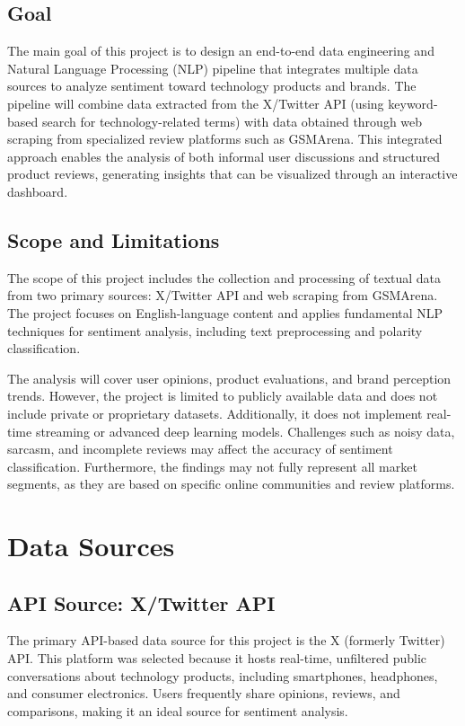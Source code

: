 \documentclass[12pt]{article}
\begin{document}
\subsection{Goal}
The main goal of this project is to design an end-to-end data engineering and Natural Language Processing (NLP) pipeline that integrates multiple data sources to analyze sentiment toward technology products and brands. The pipeline will combine data extracted from the X/Twitter API (using keyword-based search for technology-related terms) with data obtained through web scraping from specialized review platforms such as GSMArena. This integrated approach enables the analysis of both informal user discussions and structured product reviews, generating insights that can be visualized through an interactive dashboard.

\subsection{Scope and Limitations}
The scope of this project includes the collection and processing of textual data from two primary sources: X/Twitter API and web scraping from GSMArena. The project focuses on English-language content and applies fundamental NLP techniques for sentiment analysis, including text preprocessing and polarity classification.

The analysis will cover user opinions, product evaluations, and brand perception trends. However, the project is limited to publicly available data and does not include private or proprietary datasets. Additionally, it does not implement real-time streaming or advanced deep learning models. Challenges such as noisy data, sarcasm, and incomplete reviews may affect the accuracy of sentiment classification. Furthermore, the findings may not fully represent all market segments, as they are based on specific online communities and review platforms.

\section{Data Sources}

\subsection{API Source: X/Twitter API}

The primary API-based data source for this project is the X (formerly Twitter) API. This platform was selected because it hosts real-time, unfiltered public conversations about technology products, including smartphones, headphones, and consumer electronics. Users frequently share opinions, reviews, and comparisons, making it an ideal source for sentiment analysis.
\end{document}
